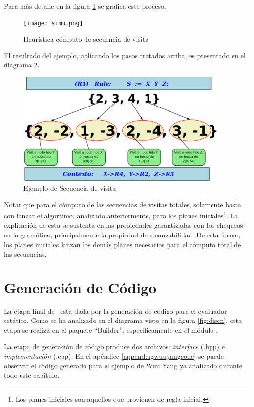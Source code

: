 Para más detalle en la figura \ref{fig:simul} se grafica este proceso.

\begin{figure}[!ht]\centering
\texttt{[image: simu.png]}
\caption{\label{fig:simul}Heurística cómputo de secuencia de visita}
\end{figure}

El resultado del ejemplo, aplicando los pasos tratados arriba, es presentado en el diagrama \ref{fig:resul_vis}.

\begin{figure}[!ht]\centering
\includegraphics[width=300pt,height=160pt]{plan2seq.png}
\caption{\label{fig:resul_vis} Ejemplo de Secuencia de visita}
\end{figure}

Notar que para el cómputo de las secuencias de visitas totales, solamente basta con lanzar el algortimo, analizado anteriormente, para los planes iniciales\footnote{Los planes iniciales son aquellos que provienen de regla inicial.}. La explicación de esto se sustenta en las propiedades garantizadas con los chequeos en la gramática, principalmente la propiedad de alcanzabilidad. De esta forma, los planes iniciales lanzan los demás planes necesarios para el cómputo total de las secuencias.

\section{Generación de Código}
\label{sec:gencodigo}

La etapa final de \maggen\ esta dada por la generación de código para el evaluador estático. Como se ha analizado en el diagrama visto en la figura \ref{fig:disen}, esta etapa se realiza en el paquete ``Builder'', específicamente en el módulo .

La etapa de generación de código produce dos archivos: \textit{interface} (.hpp) e \textit{implementación} (.cpp). En el apéndice \ref{append:agwuuyangcode} se puede observar el código generado para el ejemplo de Wuu Yang ya analizado durante todo este capítulo.

